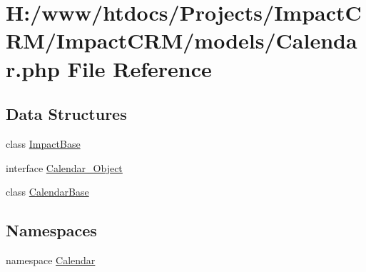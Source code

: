 \hypertarget{Calendar_8php}{
\section{H:/www/htdocs/Projects/ImpactCRM/ImpactCRM/models/Calendar.php File Reference}
\label{Calendar_8php}
}
\subsection*{Data Structures}
\begin{DoxyCompactItemize}
\item 
class \hyperlink{classImpactBase}{ImpactBase}
\item 
interface \hyperlink{interfaceCalendar__Object}{Calendar\_\-Object}
\item 
class \hyperlink{classCalendarBase}{CalendarBase}
\end{DoxyCompactItemize}
\subsection*{Namespaces}
\begin{DoxyCompactItemize}
\item 
namespace \hyperlink{namespaceCalendar}{Calendar}
\end{DoxyCompactItemize}
